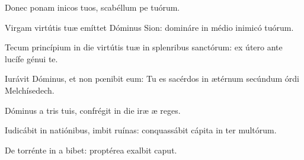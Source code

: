 \item {}

\item Donec ponam inicos tuos,\psstar{} scabéllum pe tuórum.

\item Virgam virtútis tuæ emíttet Dóminus  Sion:\psstar{} domináre in médio inimicó tuórum.

\item Tecum princípium in die virtútis tuæ in splenribus sanctórum:\psstar{} ex útero ante lucífe génui te.

\item Iurávit Dóminus, et non pœnibit eum:\psstar{} Tu es sacérdos in ætérnum secúndum órdi Melchísedech.

\item Dóminus a tris tuis,\psstar{} confrégit in die iræ æ reges.

\item Iudicábit in natiónibus, imbit ruínas:\psstar{} conquassábit cápita in ter multórum.

\item De torrénte in a bibet:\psstar{} proptérea exalbit caput.
